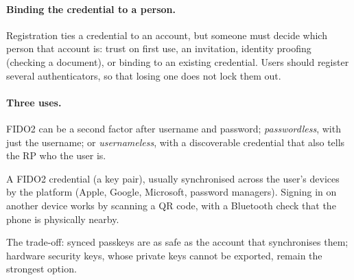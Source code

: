 \paragraph{Binding the credential to a person.} Registration ties a credential to an account, but someone must decide which person that account is: trust on first use, an invitation, identity proofing (checking a document), or binding to an existing credential. Users should register several authenticators, so that losing one does not lock them out.

\paragraph{Three uses.} FIDO2 can be a second factor after username and password; \emph{passwordless}, with just the username; or \emph{usernameless}, with a discoverable credential that also tells the RP who the user is.

\begin{definition}[Passkey]
A FIDO2 credential (a key pair), usually synchronised across the user's devices by the platform (Apple, Google, Microsoft, password managers). Signing in on another device works by scanning a QR code, with a Bluetooth check that the phone is physically nearby.
\end{definition}

The trade-off: synced passkeys are as safe as the account that synchronises them; hardware security keys, whose private keys cannot be exported, remain the strongest option.

